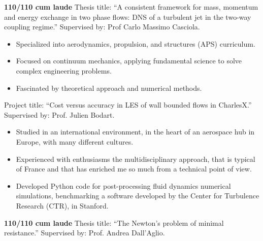 	\newline
	\textbf{110/110 cum laude} Thesis title: ``A consistent framework for mass, momentum and energy exchange in two phase flows: DNS of a turbulent jet in the two-way coupling regime.'' Supervised by: Prof Carlo Massimo Casciola. \\
	\smallskip
	\begin{itemize}
		\item Specialized into aerodynamics, propulsion, and structures (APS) curriculum.
		\item Focused on continuum mechanics, applying fundamental science to solve complex engineering problems.
		\item Fascinated by theoretical approach and numerical methods.
	\end{itemize}
	\medskip

	\divider

	Project title: ``Cost versus accuracy in LES of wall bounded flows in CharlesX.'' Supervised by: Prof. Julien Bodart. \\
	\medskip
	\begin{itemize}
		\item Studied in an international environment, in the heart of an aerospace hub in Europe, with many different cultures.
		\item Experienced with enthusiasms the multidisciplinary  approach, that is typical of France and that has enriched me so much from a technical point of view.
		\item Developed Python code for post-processing fluid dynamics numerical simulations, benchmarking a software developed by the Center for Turbulence Research (CTR), in Stanford.
	\end{itemize}
	\medskip

	\divider

	\newline
	\textbf{110/110 cum laude} Thesis title: ``The Newton's problem of minimal resistance.'' Supervised by: Prof. Andrea Dall'Aglio. \\
	\medskip
	\cvtag{\LaTeX}

